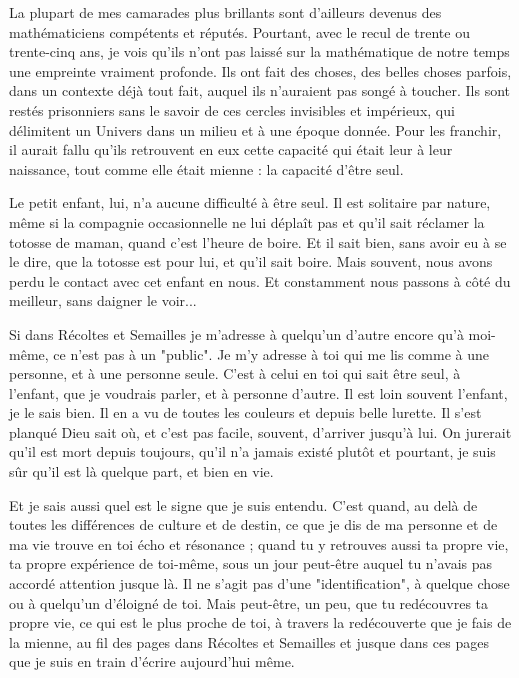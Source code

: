 La plupart de mes camarades plus brillants sont d'ailleurs devenus des mathématiciens compétents et réputés. Pourtant, avec le recul de trente ou trente-cinq ans, je vois qu'ils n'ont pas laissé sur la mathématique de notre temps une empreinte vraiment profonde. Ils ont fait des choses, des belles choses parfois, dans un contexte déjà tout fait, auquel ils n'auraient pas songé à toucher. Ils sont restés prisonniers sans le savoir de ces cercles invisibles et impérieux, qui délimitent un Univers dans un milieu et à une époque donnée. Pour les franchir, il aurait fallu qu'ils retrouvent en eux cette capacité qui était leur à leur naissance, tout comme elle était mienne : la capacité d'être seul.

Le petit enfant, lui, n'a aucune difficulté à être seul. Il est solitaire par nature, même si la compagnie occasionnelle ne lui déplaît pas et qu'il sait réclamer la totosse de maman, quand c'est l'heure de boire. Et il sait bien, sans avoir eu à se le dire, que la totosse est pour lui, et qu'il sait boire. Mais souvent, nous avons perdu le contact avec cet enfant en nous. Et constamment nous passons à côté du meilleur, sans daigner le voir...

Si dans Récoltes et Semailles je m'adresse à quelqu'un d'autre encore qu'à moi-même, ce n'est pas à un "public". Je m’y adresse à toi qui me lis comme à une personne, et à une personne seule. C'est à celui en toi qui sait être seul, à l'enfant, que je voudrais parler, et à personne d'autre. Il est loin souvent l'enfant, je le sais bien. Il en a vu de toutes les couleurs et depuis belle lurette. Il s'est planqué Dieu sait où, et c'est pas facile, souvent, d'arriver jusqu'à lui. On jurerait qu'il est mort depuis toujours, qu'il n'a jamais existé plutôt et pourtant, je suis sûr qu'il est là quelque part, et bien en vie.

Et je sais aussi quel est le signe que je suis entendu. C'est quand, au delà de toutes les différences de culture et de destin, ce que je dis de ma personne et de ma vie trouve en toi écho et résonance ; quand tu y retrouves aussi ta propre vie, ta propre expérience de toi-même, sous un jour peut-être auquel tu n'avais pas accordé attention jusque là. Il ne s'agit pas d'une "identification", à quelque chose ou à quelqu'un d'éloigné de toi. Mais peut-être, un peu, que tu redécouvres ta propre vie, ce qui est le plus proche de toi, à travers la redécouverte que je fais de la mienne, au fil des pages dans Récoltes et Semailles et jusque dans ces pages que je suis en train d'écrire aujourd'hui même.



